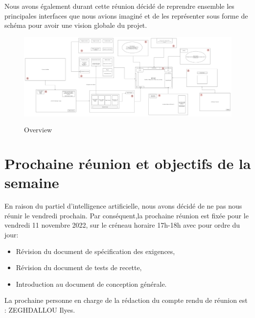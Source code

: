 \documentclass[a4paper, 12pt]{article}
\begin{document}
Nous avons également durant cette réunion décidé de reprendre ensemble les principales interfaces que nous avions imaginé et de les représenter sous forme de schéma pour avoir une vision globale du projet.
\\
 \begin{figure}[!h]
    \centering
    \includegraphics[scale=0.18]{overview.png}
    \label{fig:Le_planning}
    \caption{Overview}
\end{figure}



\section{Prochaine réunion et objectifs de la semaine}
En raison du partiel d'intelligence artificielle, nous avons décidé de ne pas nous réunir le vendredi prochain. Par conséquent,la prochaine réunion est fixée pour le vendredi 11 novembre 2022, sur le créneau horaire 17h-18h avec pour ordre du jour:
\\

\begin{itemize}
    \item Révision du document de spécification des exigences,
    \item Révision du document de tests de recette,
    \item Introduction au document de conception générale. \\
\end{itemize}

La prochaine personne en charge de la rédaction du compte rendu de réunion est : ZEGHDALLOU Ilyes.
\end{document}
